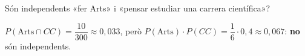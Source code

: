 \begin{apartats}
\begin{nomesllarg}
Són independents «fer Arts» i «pensar estudiar una carrera científica»?

\begin{solucio}
$P(\text{Arts}\cap CC)=\dfrac{10}{300}\approx0{,}033$, però
$P(\text{Arts})\cdot P(CC)=\dfrac16\cdot0{,}4\approx0{,}067$: \textbf{no} són independents.
\end{solucio}
\end{nomesllarg}

\end{apartats}
